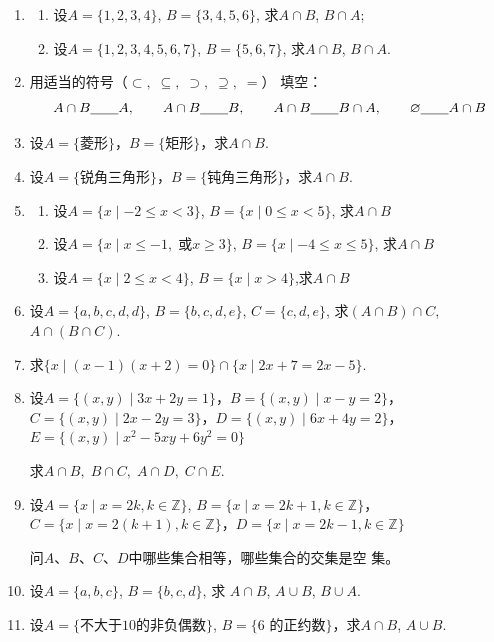 \begin{enumerate}
    \item \begin{enumerate}[(1)]
        \item 设$A=\{1,2,3,4\}$, $B=\{3,4,5,6\}$, 求$A\cap B$, $B\cap A$; 
        \item 设$A=\{1,2,3,4,5,6,7\}$, $B=\{5,6,7\}$, 
   求$A\cap B$, $B\cap A$.
    \end{enumerate}

\item 用适当的符号（$\subset,\; \subseteq,\; \supset,\; \supseteq,\; =$）
填空：
\[A\cap B\underline{\qquad} A,\qquad A\cap B\underline{\qquad} B,\qquad A\cap B\underline{\qquad} B\cap A,\qquad \varnothing\underline{\qquad} A\cap B\] 
\item 设$A=\{\text{菱形}\}$，$B=\{\text{矩形}\}$，求$A\cap B$.
\item 设$A=\{\text{锐角三角形}\}$，$B=\{\text{钝角三角形}\}$，求$A\cap B$.
\item \begin{enumerate}[(1)]
    \item 设$A=\{x\mid -2\le x<3\}$, $B=\{x\mid 0\le x<5\}$, 求$A\cap B$
    \item 设$A=\{x\mid x\le -1,\; \text{或}x\ge 3\}$, $B=\{x\mid -4\le x\le 5\}$, 求$A\cap B$
    \item 设$A=\{x\mid 2\le  x<4\}$, $B=\{x\mid x>4\}$,求$A\cap B$
\end{enumerate}
\item 设$A=\{a,b,c,d,d\}$, $B=\{b,c,d,e\}$, $C=\{c,d,e\}$, 求$(A\cap B)\cap C$, $A\cap(B\cap C)$.
\item 求$\{x\mid (x-1)(x+2)=0\}\cap\{x\mid 2x+7=2x-5\}$.


\item 设$A=\{(x,y)\mid 3x+2y=1\}$，$B=\{(x,y)\mid x-y=2\}$，$C=\{(x,y)\mid 2x-2y=3\}$，$D=\{(x,y)\mid 6x+4y=2\}$，$E=\{(x,y)\mid x^2-5xy+6y^2=0\}$

求$A\cap B,\; B\cap C,\; A\cap D,\; C\cap E$.

\item 设$A=\{x\mid x=2k,k\in \mathbb{Z}\}$, $B=\{x\mid x=2k+1,k\in \mathbb{Z}\}$，$C=\{x\mid x=2(k+1), k\in\mathbb{Z}\}$，$D=\{x\mid x=2k-1, k\in\mathbb{Z}\}$

问$A$、$B$、$C$、$D$中哪些集合相等，哪些集合的交集是空
集。
\item 设$A=\{a,b,c\}$, $B=\{b,c,d\}$, 求
$A\cap B$, $A\cup B$, $B\cup A$.

\item 设$A=\{\text{不大于10的非负偶数}\}$, $B=\{\text{6
的正约数}\}$，求$A\cap B$, $A\cup B$.


\end{enumerate}
